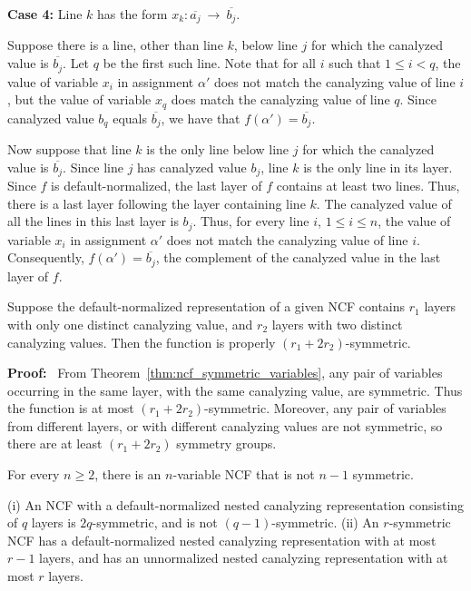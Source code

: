 \medskip

\noindent
{\bf Case 4:} Line $k$ has the form  $x_k : \overline{a_j} ~\longrightarrow~ \overline{b_j}$. 

\smallskip

Suppose there is a line, other than line $k$, below line $j$ for
which the canalyzed value is $\overline{b_j}$.  Let $q$ be the
first such line.  Note that for all $i$ such that $1 \leq i < q$,
the value of variable $x_i$ in assignment $\alpha'$ does not match
the canalyzing value of line $i$, but the value of variable $x_q$
does match the canalyzing value of line $q$.  Since canalyzed value
$b_q$ equals $\overline{b_j}$, we have that $f(\alpha') =
\overline{b_j}$.

Now suppose that line $k$ is the only line below line $j$ for which
the canalyzed value is $\overline{b_j}$.  Since line $j$ has
canalyzed value $b_j$, line $k$ is the only line in its layer.
Since $f$ is default-normalized, the last layer of $f$ contains at least
two lines.  Thus, there is a last layer following the layer containing
line $k$.  The canalyzed value of all the lines in this last layer
is $b_j$.  Thus, for every line $i$, $1 \leq i \leq n$, the value
of variable $x_i$ in assignment $\alpha'$ does not match the
canalyzing value of line $i$.  Consequently, $f(\alpha') =
\overline{b_j}$, the complement of the canalyzed value in the last
layer of $f$.  \QED

\begin{theorem}\label{thm:ncf_r_symmetric}
Suppose the default-normalized representation of a given NCF contains 
$r_1$ layers with only one distinct canalyzing value,
and $r_2$ layers with two distinct canalyzing values.
Then the function is properly $(r_1 + 2 r_2)$-symmetric.
\end{theorem}

\noindent
\textbf{Proof:}~
From Theorem~\ref{thm:ncf_symmetric_variables}, 
any pair of variables occurring in the same layer, 
with the same canalyzing value, are symmetric.
Thus the function is at most $(r_1 + 2 r_2)$-symmetric.
Moreover, any pair of variables from different layers, or with different canalyzing values
are not symmetric, so there are at least $(r_1 + 2 r_2)$ symmetry groups.
\QED

\begin{corollary}\label{cor:ncf_not_rsymm}
For every $n \geq 2$, there is an $n$-variable NCF that is not $n-1$ symmetric. \QED
\end{corollary}

\begin{corollary}\label{cor:ncf_r_symmetric_layers}
(i) An NCF with a default-normalized nested canalyzing representation consisting
of $q$ layers is $2q$-symmetric, and is not $(q-1)$-symmetric.
(ii) An $r$-symmetric NCF has a default-normalized nested canalyzing representation
with at most $r-1$ layers, and has an unnormalized nested canalyzing
representation with at most $r$ layers.   \QED
\end{corollary}

